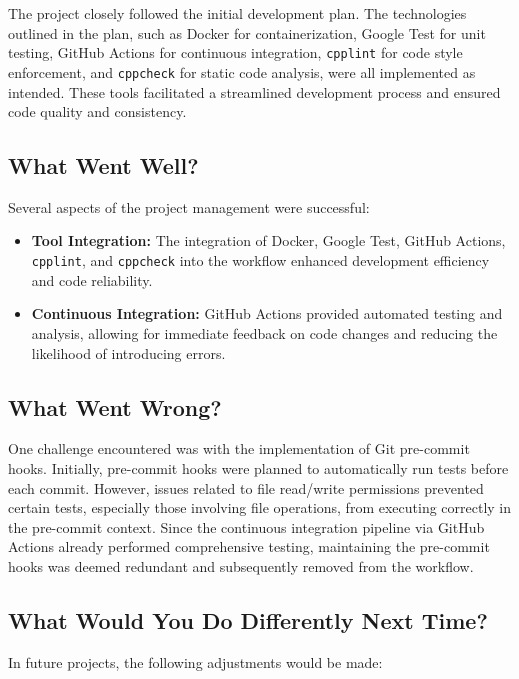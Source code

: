 \documentclass{article}
\begin{document}
The project closely followed the initial development plan. The technologies
outlined in the plan, such as Docker for containerization, Google Test for unit
testing, GitHub Actions for continuous integration, \texttt{cpplint} for code
style enforcement, and \texttt{cppcheck} for static code analysis, were all
implemented as intended. These tools facilitated a streamlined development
process and ensured code quality and consistency.

\subsection{What Went Well?}

Several aspects of the project management were successful:

\begin{itemize}
    \item \textbf{Tool Integration:} The integration of Docker, Google Test,
    GitHub Actions, \texttt{cpplint}, and \texttt{cppcheck} into the workflow
    enhanced development efficiency and code reliability.
    \item \textbf{Continuous Integration:} GitHub Actions provided automated
    testing and analysis, allowing for immediate feedback on code changes and
    reducing the likelihood of introducing errors.
\end{itemize}

\subsection{What Went Wrong?}

One challenge encountered was with the implementation of Git pre-commit hooks.
Initially, pre-commit hooks were planned to automatically run tests before each
commit. However, issues related to file read/write permissions prevented certain
tests, especially those involving file operations, from executing correctly in
the pre-commit context. Since the continuous integration pipeline via GitHub
Actions already performed comprehensive testing, maintaining the pre-commit
hooks was deemed redundant and subsequently removed from the workflow.

\subsection{What Would You Do Differently Next Time?}

In future projects, the following adjustments would be made:
\end{document}
